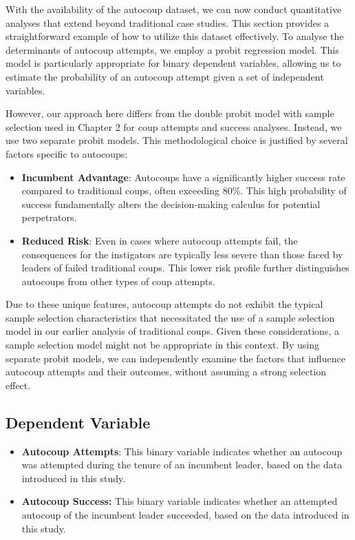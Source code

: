 \documentclass[
  12pt,
]{report}
\begin{document}
With the availability of the autocoup dataset, we can now conduct
quantitative analyses that extend beyond traditional case studies. This
section provides a straightforward example of how to utilize this
dataset effectively. To analyse the determinants of autocoup attempts,
we employ a probit regression model. This model is particularly
appropriate for binary dependent variables, allowing us to estimate the
probability of an autocoup attempt given a set of independent variables.

However, our approach here differs from the double probit model with
sample selection used in Chapter 2 for coup attempts and success
analyses. Instead, we use two separate probit models. This
methodological choice is justified by several factors specific to
autocoups:

\begin{itemize}
\item
  \textbf{Incumbent Advantage}: Autocoups have a significantly higher
  success rate compared to traditional coups, often exceeding 80\%. This
  high probability of success fundamentally alters the decision-making
  calculus for potential perpetrators.
\item
  \textbf{Reduced Risk}: Even in cases where autocoup attempts fail, the
  consequences for the instigators are typically less severe than those
  faced by leaders of failed traditional coups. This lower risk profile
  further distinguishes autocoups from other types of coup attempts.
\end{itemize}

Due to these unique features, autocoup attempts do not exhibit the
typical sample selection characteristics that necessitated the use of a
sample selection model in our earlier analysis of traditional coups.
Given these considerations, a sample selection model might not be
appropriate in this context. By using separate probit models, we can
independently examine the factors that influence autocoup attempts and
their outcomes, without assuming a strong selection effect.

\subsection{Dependent Variable}\label{dependent-variable}

\begin{itemize}
\item
  \textbf{Autocoup Attempts}: This binary variable indicates whether an
  autocoup was attempted during the tenure of an incumbent leader, based
  on the data introduced in this study.
\item
  \textbf{Autocoup Success:} This binary variable indicates whether an
  attempted autocoup of the incumbent leader succeeded, based on the
  data introduced in this study.
\end{itemize}
\end{document}
